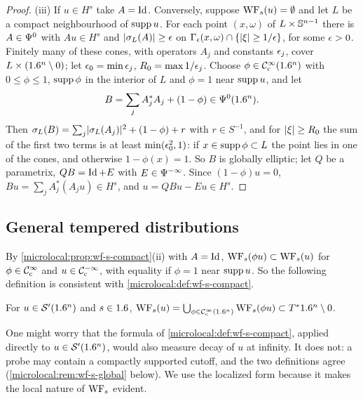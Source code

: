 \begin{proof}
  (iii) If $u\in H^s$ take $A=\operatorname{Id}$. Conversely, suppose $\operatorname{WF}_s(u)=\emptyset$
  and let $L$ be a compact neighbourhood of $\operatorname{supp} u$. For each point $(x,\omega)$
  of $L\times\mathbb{S}^{n-1}$ there is $A\in\Psi^{0}$ with $Au\in H^s$ and
  $\lvert \sigma_L(A)\rvert\ge\epsilon$ on $\Gamma_\epsilon(x,\omega)\cap\{\lvert \xi\rvert\ge1/\epsilon\}$, for
  some $\epsilon>0$. Finitely many of these cones, with operators $A_j$ and
  constants $\epsilon_j$, cover $L\times(1.6^n\setminus0)$; let
  $\epsilon_0=\min\epsilon_j$, $R_0=\max1/\epsilon_j$. Choose $\phi\in\mathcal{C}^\infty_{\mathrm{c}}(1.6^n)$ with
  $0\le\phi\le1$, $\operatorname{supp}\phi$ in the interior of $L$ and $\phi=1$ near
  $\operatorname{supp} u$, and let
  \begin{equation*}
    B=\sum_jA_j^*A_j+(1-\phi)\in\Psi^{0}(1.6^n).
  \end{equation*}
  Then $\sigma_L(B)=\sum_j\lvert \sigma_L(A_j)\rvert^2+(1-\phi)+r$ with $r\in S^{-1}$,
  and for $\lvert \xi\rvert\ge R_0$ the sum of the first two terms is at least
  $\min(\epsilon_0^2,1)$: if $x\in\operatorname{supp}\phi\subset L$ the point lies in one of the
  cones, and otherwise $1-\phi(x)=1$. So $B$ is globally elliptic; let $Q$ be a
  parametrix, $QB=\operatorname{Id}+E$ with $E\in\Psi^{-\infty}$. Since $(1-\phi)u=0$,
  $Bu=\sum_jA_j^*(A_ju)\in H^s$, and $u=QBu-Eu\in H^s$.
\end{proof}

\subsection{General tempered distributions}
By \cref{microlocal:prop:wf-s-compact}(ii) with $A=\operatorname{Id}$,
$\operatorname{WF}_s(\phi u)\subset\operatorname{WF}_s(u)$ for $\phi\in\mathcal{C}^\infty_{\mathrm{c}}$ and $u\in\mathcal{C}^{-\infty}_{\mathrm{c}}$, with
equality if $\phi=1$ near $\operatorname{supp} u$. So the following definition is
consistent with \cref{microlocal:def:wf-s-compact}.

\begin{definition}\label{microlocal:def:wf-s}
  For $u\in\mathcal{S}'(1.6^n)$ and $s\in1.6$,
  $\operatorname{WF}_s(u)=\bigcup_{\phi\in\mathcal{C}^\infty_{\mathrm{c}}(1.6^n)}\operatorname{WF}_s(\phi u)\subset T^*1.6^n\setminus0$.
\end{definition}

One might worry that the formula of \cref{microlocal:def:wf-s-compact},
applied directly to $u\in\mathcal{S}'(1.6^n)$, would also measure decay of $u$ at
infinity. It does not: a probe may contain a compactly supported cutoff, and
the two definitions agree (\cref{microlocal:rem:wf-s-global} below). We use
the localized form because it makes the local nature of $\operatorname{WF}_s$ evident.

